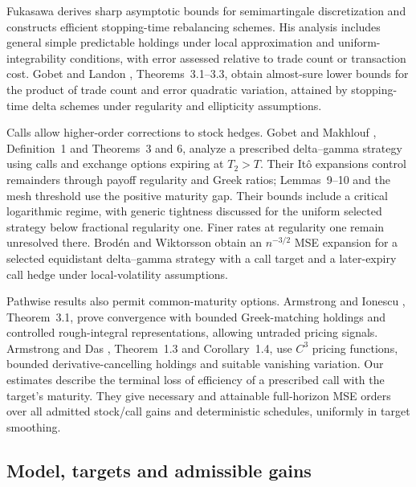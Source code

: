 \documentclass[11pt,a4paper]{amsart}
\theoremstyle{plain}
\theoremstyle{definition}
\theoremstyle{remark}
\begin{document}
Fukasawa \cite{F2011a,F2011b,F2014} derives sharp asymptotic bounds for semimartingale discretization and constructs efficient stopping-time rebalancing schemes. His analysis includes general simple predictable holdings under local approximation and uniform-integrability conditions, with error assessed relative to trade count or transaction cost. Gobet and Landon \cite{GL2014}, Theorems~3.1--3.3, obtain almost-sure lower bounds for the product of trade count and error quadratic variation, attained by stopping-time delta schemes under regularity and ellipticity assumptions.

Calls allow higher-order corrections to stock hedges. Gobet and Makhlouf \cite{GM2009}, Definition~1 and Theorems~3 and 6, analyze a prescribed delta--gamma strategy using calls and exchange options expiring at $T_2>T$. Their It\^o expansions control remainders through payoff regularity and Greek ratios; Lemmas~9--10 and the mesh threshold use the positive maturity gap. Their bounds include a critical logarithmic regime, with generic tightness discussed for the uniform selected strategy below fractional regularity one. Finer rates at regularity one remain unresolved there. Brod\'en and Wiktorsson \cite{BW2010} obtain an $n^{-3/2}$ MSE expansion for a selected equidistant delta--gamma strategy with a call target and a later-expiry call hedge under local-volatility assumptions.

Pathwise results also permit common-maturity options. Armstrong and Ionescu \cite{AI2025}, Theorem~3.1, prove convergence with bounded Greek-matching holdings and controlled rough-integral representations, allowing untraded pricing signals. Armstrong and Das \cite{AD2026}, Theorem~1.3 and Corollary~1.4, use $C^3$ pricing functions, bounded derivative-cancelling holdings and suitable vanishing variation. Our estimates describe the terminal loss of efficiency of a prescribed call with the target's maturity. They give necessary and attainable full-horizon MSE orders over all admitted stock/call gains and deterministic schedules, uniformly in target smoothing.

\subsection{Model, targets and admissible gains}
\end{document}
